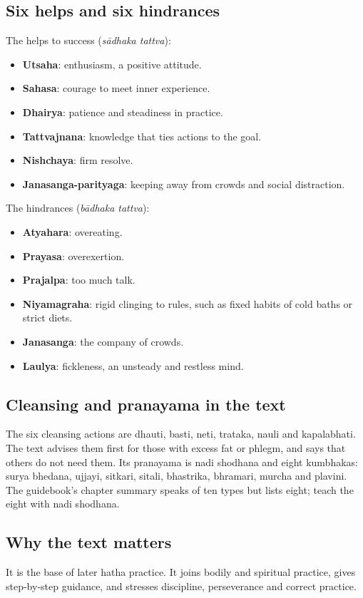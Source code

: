 \subsection*{Six helps and six hindrances}
The helps to success (\emph{sādhaka tattva}):
\begin{itemize}
\item \textbf{Utsaha}: enthusiasm, a positive attitude.
\item \textbf{Sahasa}: courage to meet inner experience.
\item \textbf{Dhairya}: patience and steadiness in practice.
\item \textbf{Tattvajnana}: knowledge that ties actions to the goal.
\item \textbf{Nishchaya}: firm resolve.
\item \textbf{Janasanga-parityaga}: keeping away from crowds and social distraction.
\end{itemize}
The hindrances (\emph{bādhaka tattva}):
\begin{itemize}
\item \textbf{Atyahara}: overeating.
\item \textbf{Prayasa}: overexertion.
\item \textbf{Prajalpa}: too much talk.
\item \textbf{Niyamagraha}: rigid clinging to rules, such as fixed habits of cold baths or strict diets.
\item \textbf{Janasanga}: the company of crowds.
\item \textbf{Laulya}: fickleness, an unsteady and restless mind.
\end{itemize}

\subsection*{Cleansing and pranayama in the text}
The six cleansing actions are dhauti, basti, neti, trataka, nauli and kapalabhati. The text advises them first for those with excess fat or phlegm, and says that others do not need them. Its pranayama is nadi shodhana and eight kumbhakas: surya bhedana, ujjayi, sitkari, sitali, bhastrika, bhramari, murcha and plavini. The guidebook's chapter summary speaks of ten types but lists eight; teach the eight with nadi shodhana.

\subsection*{Why the text matters}
It is the base of later hatha practice. It joins bodily and spiritual practice, gives step-by-step guidance, and stresses discipline, perseverance and correct practice.


